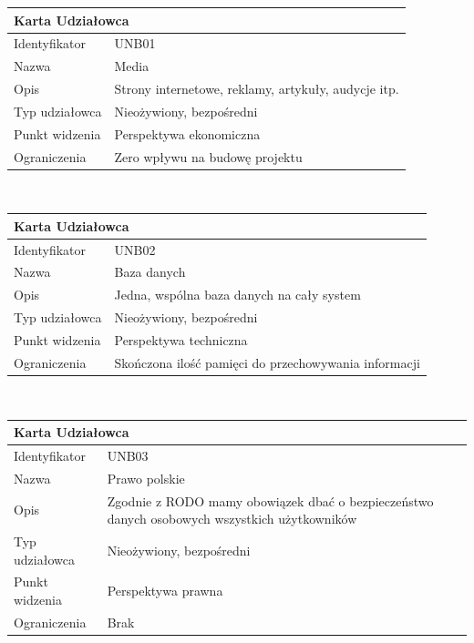 \documentclass[a4paper,11pt]{report}
\begin{document}
	\newline
	\vspace{0.2cm}
	\newline
	\begin{tabular}{|p{3cm}|p{11cm}|}
	\hline
	\multicolumn{2}{|l|}{\textbf{Karta Udziałowca}}\\
	\hline
	Identyfikator&UNB01\\
	\hline
	Nazwa&Media\\
	\hline
	Opis&Strony internetowe, reklamy, artykuły, audycje itp.\\
	\hline
	Typ udziałowca&Nieożywiony, bezpośredni\\
	\hline
	Punkt widzenia&Perspektywa ekonomiczna\\
	\hline
	Ograniczenia&Zero wpływu na budowę projektu\\
	\hline
	\end{tabular}\\
	\newline
	\vspace{0.2cm}
	\newline
	\begin{tabular}{|p{3cm}|p{11cm}|}
	\hline
	\multicolumn{2}{|l|}{\textbf{Karta Udziałowca}}\\
	\hline
	Identyfikator&UNB02\\
	\hline
	Nazwa&Baza danych\\
	\hline
	Opis&Jedna, wspólna baza danych na cały system\\
	\hline
	Typ udziałowca&Nieożywiony, bezpośredni\\
	\hline
	Punkt widzenia&Perspektywa techniczna\\
	\hline
	Ograniczenia&Skończona ilość pamięci do przechowywania informacji\\
	\hline
	\end{tabular}\\
	\newline
	\vspace{0.2cm}
	\newline
	\begin{tabular}{|p{3cm}|p{11cm}|}
	\hline
	\multicolumn{2}{|l|}{\textbf{Karta Udziałowca}}\\
	\hline
	Identyfikator&UNB03\\
	\hline
	Nazwa&Prawo polskie\\
	\hline
	Opis&Zgodnie z RODO mamy obowiązek dbać o bezpieczeństwo danych osobowych wszystkich użytkowników\\
	\hline
	Typ udziałowca&Nieożywiony, bezpośredni\\
	\hline
	Punkt widzenia&Perspektywa prawna\\
	\hline
	Ograniczenia&Brak\\
	\hline
	\end{tabular}\\
\end{document}

